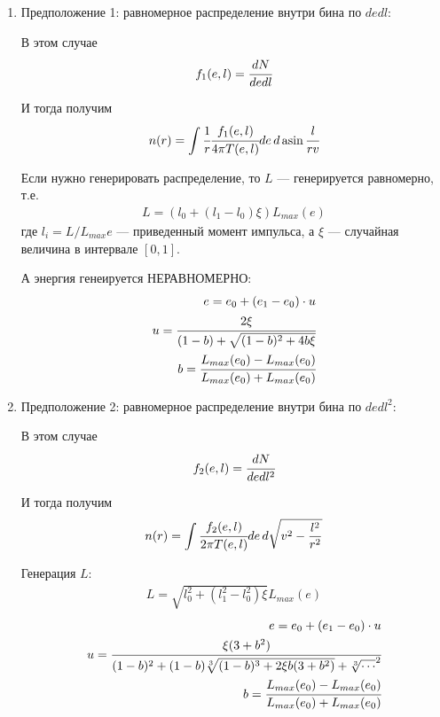 	 \begin{enumerate}
	 	\item Предположение 1: равномерное распределение внутри бина по $dedl$:
	 	
	 	В этом случае 
	 	\begin{equation}
	 		f_1(e,l) = \cfrac{dN}{de dl}
	 	\end{equation}
	 	
	 	И тогда получим
	 	\begin{equation}
	 		\label{eq:n_r}
	 		n(r) = \int{ \cfrac{1}{r} \cfrac{f_1(e,l) }{4\pi T(e,l)} de \, d\asin{\cfrac{l}{rv}} }
	 	\end{equation}
	 	
	 	Если нужно генерировать распределение, то $L$ --- генерируется равномерно, т.е.
	 	\begin{eqnarray}
			L = (l_0 + (l_1-l_0)\xi)L_{max}(e) 		
	 	\end{eqnarray}
	 	где $l_i = L/L_{max}{e}$ --- приведенный момент импульса, а $\xi$ --- случайная величина в интервале $[0,1]$.
	 	
	 	А энергия генеируется НЕРАВНОМЕРНО:
	 	\begin{eqnarray}
	 		e = e_0 + (e_1-e_0)\cdot u \\
	 		u = \cfrac{2\xi}{(1-b)+\sqrt{(1-b)^2+4b\xi}} \\
	 		b = \cfrac{L_{max}(e_0)-L_{max}(e_0)}{L_{max}(e_0)+L_{max}(e_0)}
	 	\end{eqnarray}
	 	
	 	
	 	
	 	\item Предположение 2: равномерное распределение внутри бина по $dedl^2$:
	 	
	 	В этом случае 
	 	\begin{equation}
	 		f_2(e,l) = \cfrac{dN}{de dl^2}
	 	\end{equation}
	 	
	 	И тогда получим
	 	\begin{equation}
	 		n(r) = \int{\cfrac{f_2(e,l) }{2\pi T(e,l)} de \, d\sqrt{v^2-\frac{l^2}{r^2}} }
	 	\end{equation}
	 	
	 	Генерация $L$:
	 	\begin{eqnarray}
	 		L = \sqrt{l^2_0 + (l^2_1-l^2_0)\xi}L_{max}(e) 		
	 	\end{eqnarray}
	 	\begin{eqnarray}
	 		e = e_0 + (e_1-e_0)\cdot u \\
	 		u = \cfrac{\xi(3 + b^2)}{(1-b)^2+(1-b)\sqrt[3]{(1-b)^3+2\xi b(3 + b^2)} + \sqrt[3]{\cdots}^2} \\
	 		b = \cfrac{L_{max}(e_0)-L_{max}(e_0)}{L_{max}(e_0)+L_{max}(e_0)}
	 	\end{eqnarray}
	 	

\end{enumerate}

